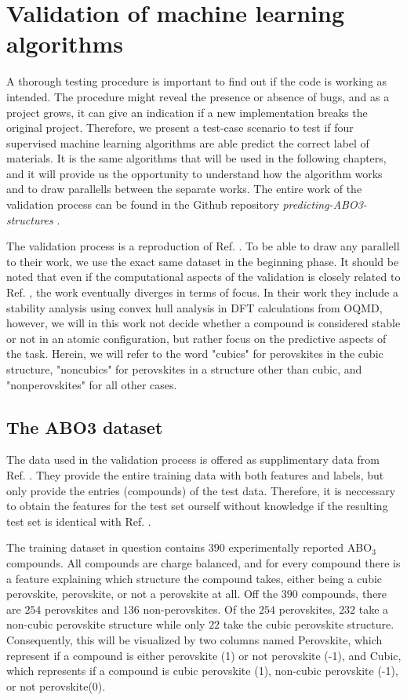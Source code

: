 \chapter{Validation of machine learning algorithms}
\label{chap:validation}

A thorough testing procedure is important to find out if the code is working as intended. The procedure might reveal the presence or absence of bugs, and as a project grows, it can give an indication if a new implementation breaks the original project. Therefore, we present a test-case scenario to test if four supervised machine learning algorithms are able predict the correct label of materials. It is the same algorithms that will be used in the following chapters, and it will provide us the opportunity to understand how the algorithm works and to draw parallells between the separate works. The entire work of the validation process can be found in the Github repository \textit{predicting-ABO3-structures} \cite{Ohebbi2021a}.

The validation process is a reproduction of Ref. \cite{Balachandran2018}. To be able to draw any parallell to their work, we use the exact same dataset in the beginning phase. It should be noted that even if the computational aspects of the validation is closely related to Ref. \cite{Balachandran2018}, the work eventually diverges in terms of focus. In their work they include a stability analysis using convex hull analysis in DFT calculations from OQMD, however, we will in this work not decide whether a compound is considered stable or not in an atomic configuration, but rather focus on the predictive aspects of the task. Herein, we will refer to the word "cubics" for perovskites in the cubic structure, "noncubics" for perovskites in a structure other than cubic, and "nonperovskites" for all other cases.

\section{The ABO3 dataset}

The data used in the validation process is offered as supplimentary data from Ref. \cite{Balachandran2018}. They provide the entire training data with both features and labels, but only provide the entries (compounds) of the test data. Therefore, it is neccessary to obtain the features for the test set ourself without knowledge if the resulting test set is identical with Ref. \cite{Balachandran2018}.

The training dataset in question contains $390$ experimentally reported ABO$_3$ compounds. All compounds are charge balanced, and for every compound there is a feature explaining which structure the compound takes, either being a cubic perovskite, perovskite, or not a perovskite at all. Off the $390$ compounds, there are $254$ perovskites and $136$ non-perovskites. Of the $254$ perovskites, $232$ take a non-cubic perovskite structure while only $22$ take the cubic perovskite structure. Consequently, this will be visualized by two columns named Perovskite, which represent if a compound is either perovskite (1) or not perovskite (-1), and Cubic, which represents if a compound is cubic perovskite (1), non-cubic perovskite (-1), or not perovskite(0).

